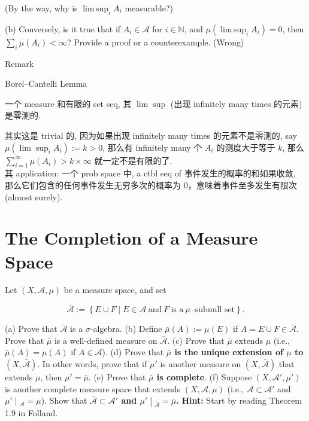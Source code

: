 \documentclass{qlnotes-export}
\begin{document}
(By the way, why is \(\operatorname{lim\, sup}_{i}A_{i}\) measurable?)

(b) Conversely, is it true that if \(A_{i} \in \mathcal{A}\) for \(i \in {\mathbb{N}}\), and \(\mu(\operatorname{lim\, sup}_{i}A_{i}) = 0\), then \(\sum_{i}\mu(A_{i}) < \infty\)? Provide a proof or a counterexample. (Wrong)

\begin{qlremark}{Remark}

\begin{theorem}{Borel--Cantelli Lemma}\label{thm-hw02-on-carath-odorys-hahn-kolmogrov-thm-borel-cantelli-lemma}

一个 measure 和有限的 set seq, 其 \(\lim\sup\) (出现 infinitely many times 的元素) 是零测的.

\end{theorem}

其实这是 trivial 的, 因为如果出现 infinitely many times 的元素不是零测的, say \(\mu(\lim\sup_{i}A_{i}) := k > 0\), 那么有 infinitely many 个 \(A_{i}\) 的测度大于等于 \(k\), 那么 \(\sum_{i = 1}^{\infty}\mu(A_{i}) > k \times \infty\) 就一定不是有限的了.\\
其 application: 一个 prob space 中, a ctbl seq of 事件发生的概率的和如果收敛, 那么它们包含的任何事件发生无穷多次的概率为 0，意味着事件至多发生有限次 (almost surely).

\end{qlremark}

\section{The Completion of a Measure Space}\label{the-completion-of-a-measure-space}

Let \((X,\mathcal{A},\mu)\) be a measure space, and set

\[\bar{\mathcal{A}} := \left\{ {E \cup F \mid E \in \mathcal{A}\ \text{and}\ F\ \text{is a}\ \mu\ \text{-subnull set}} \right\}.\]

(a) Prove that \(\bar{\mathcal{A}}\) is a \(\sigma\)-algebra. (b) Define \(\bar{\mu}(A) := \mu(E)\) if \(A = E \cup F \in \bar{\mathcal{A}}\). Prove that \(\bar{\mu}\) is a well-defined measure on \(\bar{\mathcal{A}}\). (c) Prove that \(\bar{\mu}\) extends \(\mu\) (i.e., \(\bar{\mu}(A) = \mu(A)\) if \(A \in \mathcal{A}\)). (d) Prove that \textbf{\(\bar{\mu}\) is the unique extension of \(\mu\) to \((X,\bar{\mathcal{A}})\)}. In other words, prove that if \(\mu'\) is another measure on \((X,\bar{\mathcal{A}})\) that extends \(\mu\), then \(\mu' = \bar{\mu}\). (e) Prove that \textbf{\(\bar{\mu}\) is complete}. (f) Suppose \((X,\mathcal{A}',\mu')\) is another complete measure space that extends \((X,\mathcal{A},\mu)\) (i.e., \(\mathcal{A} \subset \mathcal{A}'\) and \(\left. \mu' \middle| {}_{\mathcal{A}} = \mu \right.\)). Show that \textbf{\(\bar{\mathcal{A}} \subset \mathcal{A}'\) and \(\left. \mu' \middle| {}_{\bar{\mathcal{A}}} = \bar{\mu} \right.\).} \textbf{Hint:} Start by reading Theorem 1.9 in Folland.
\end{document}
